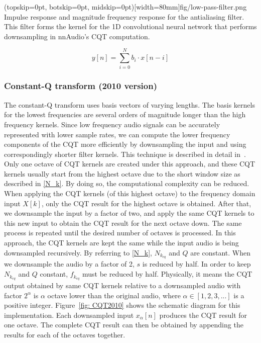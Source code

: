 \documentclass{ieeeaccess}
\begin{document}
\Figure(topskip=0pt, botskip=0pt, midskip=0pt)[width=80mm]{fig/low-pass-filter.png}
{Impulse response and magnitude frequency response for the antialiasing filter. This filter forms the kernel for the 1D convolutional neural network that performs downsampling in nnAudio's CQT computation. \label{fig:low-pass-filter}}

\begin{equation}
    y[n] = \sum_{i=0}^{N}b_i\cdot x[n-i]
    \label{FIR}
\end{equation}


\subsubsection{Constant-Q transform (2010 version)}

The constant-Q transform uses basis vectors of varying lengths. The basis kernels for the lowest frequencies are several orders of magnitude longer than the high frequency kernels. Since low frequency audio signals can be accurately represented with lower sample rates, we can compute the lower frequency components of the CQT more efficiently by downsampling the input and using correspondingly shorter filter kernels. This technique is described in detail in~\cite{schorkhuber2010constant, brown1991calculation}. Only one octave of CQT kernels are created under this approach, and these CQT kernels usually start from the highest octave due to the short window size as described in \eqref{N_k}. By doing so, the computational complexity can be reduced. When applying the CQT kernels (of this highest octave) to the frequency domain input $X[k]$, only the CQT result for the highest octave is obtained. After that, we downsample the input by a factor of two, and apply the same CQT kernels to this new input to obtain the CQT result for the next octave down. The same process is repeated until the desired number of octaves is processed. In this approach, the CQT kernels are kept the same while the input audio is being downsampled recursively. By referring to \eqref{N_k}, $N_{k_{cq}}$ and $Q$ are constant. When we downsample the audio by a factor of 2, $s$ is reduced by half. In order to keep $N_{k_{cq}}$ and $Q$ constant, $f_{k_{cq}}$ must be reduced by half. Physically, it means the CQT output obtained by same CQT kernels relative to a downsampled audio with factor $2^\alpha$ is $\alpha$ octave lower than the original audio, where $\alpha \in [1,2,3,...]$ is a positive integer. Figure~\ref{fig: CQT2010} shows the schematic diagram for this implementation. Each downsampled input $x_\alpha[n]$ produces the CQT result for one octave. The complete CQT result can then be obtained by appending the results for each of the octaves together.
\end{document}
